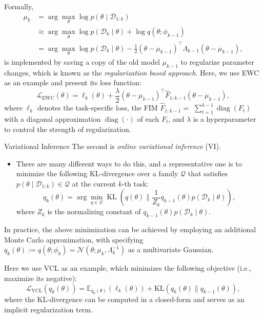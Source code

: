 \documentclass[9pt,dvipsnames]{beamer}
\begin{document}
\begin{frame}
    Formally,
    $$
        \begin{aligned}
            \mu_{k} & =\arg \max _{\theta} \log p\left(\theta \mid \mathcal{D}_{1: k}\right)                                                                                          \\
                    & \approx \arg \max _{\theta} \log p\left(\mathcal{D}_{k} \mid \theta\right)+\log q\left(\theta ; \phi_{k-1}\right)                                               \\
                    & =\arg \max _{\theta} \log p\left(\mathcal{D}_{k} \mid \theta\right)-\frac{1}{2}\left(\theta-\mu_{k-1}\right)^{\top} \Lambda_{k-1}\left(\theta-\mu_{k-1}\right),
        \end{aligned}
    $$
    is implemented by saving a copy of the old model $\mu_{k-1}$ to regularize parameter changes, which is known as the \textit{regularization based approach}. Here, we use EWC as an example and present its loss function:
    $$
        \mathcal{L}_{\mathrm{EWC}}(\theta)=\ell_{k}(\theta)+\frac{\lambda}{2}\left(\theta-\mu_{k-1}\right)^{\top} \hat{F}_{1: k-1}\left(\theta-\mu_{k-1}\right),
    $$
    where $\ell_{k}$ denotes the task-specific loss, the FIM $\hat{F}_{1: k-1}=$ $\sum_{t=1}^{k-1} \operatorname{diag}\left(F_{t}\right)$ with a diagonal approximation $\operatorname{diag}(\cdot)$ of each $F_{t}$, and $\lambda$ is a hyperparameter to control the strength of regularization.
\end{frame}

\begin{frame}{Variational Inference}
    The second is \textit{online variational inference} (VI).
    \begin{itemize}
        \item There are many different ways to do this, and a representative one is to minimize the following KL-divergence over a family $\mathcal{Q}$ that satisfies $p\left(\theta \mid \mathcal{D}_{1: k}\right) \in \mathcal{Q}$ at the current $k$-th task:
              $$
                  q_{k}(\theta)=\arg \min _{q \in \mathcal{Q}} \operatorname{KL}\left(q(\theta) \| \frac{1}{Z_{k}} q_{k-1}(\theta) p\left(\mathcal{D}_{k} \mid \theta\right)\right),
              $$
              where $Z_{k}$ is the normalizing constant of $q_{k-1}(\theta) p\left(\mathcal{D}_{k} \mid \theta\right)$.
    \end{itemize}
    In practice, the above minimization can be achieved by employing an additional Monte Carlo approximation, with specifying $q_{k}(\theta):=q\left(\theta ; \phi_{k}\right)=\mathcal{N}\left(\theta ; \mu_{k}, \Lambda_{k}^{-1}\right)$ as a multivariate Gaussian.

    Here we use VCL as an example, which minimizes the following objective (i.e., maximize its  negative):
    $$
        \mathcal{L}_{\mathrm{VCL}}\left(q_{k}(\theta)\right)=\mathbb{E}_{q_{k}(\theta)}\left(\ell_{k}(\theta)\right)+\mathrm{KL}\left(q_{k}(\theta) \| q_{k-1}(\theta)\right),
    $$
    where the KL-divergence can be computed in a closed-form  and serves as an implicit regularization term.

\end{frame}
\end{document}
